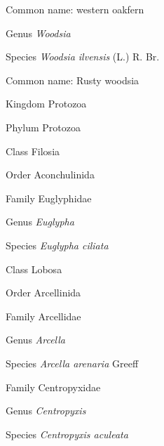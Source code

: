 \documentclass[9pt, article]{memoir}
\begin{document}
\begin{multicols}{2}
Common name: western oakfern

\vspace{6pt}\noindent\hspace{30pt}Genus \textit{Woodsia}


\vspace{6pt}\noindent\hspace{36pt}Species \textit{Woodsia ilvensis} (L.) R. Br.


Common name: Rusty woodsia

\vspace{6pt}\noindent\hspace{0pt}Kingdom Protozoa


\vspace{6pt}\noindent\hspace{6pt}Phylum Protozoa


\vspace{6pt}\noindent\hspace{12pt}Class Filosia


\vspace{6pt}\noindent\hspace{18pt}Order Aconchulinida


\vspace{6pt}\noindent\hspace{24pt}Family Euglyphidae


\vspace{6pt}\noindent\hspace{30pt}Genus \textit{Euglypha}


\vspace{6pt}\noindent\hspace{36pt}Species \textit{Euglypha ciliata}


\vspace{6pt}\noindent\hspace{12pt}Class Lobosa


\vspace{6pt}\noindent\hspace{18pt}Order Arcellinida


\vspace{6pt}\noindent\hspace{24pt}Family Arcellidae


\vspace{6pt}\noindent\hspace{30pt}Genus \textit{Arcella}


\vspace{6pt}\noindent\hspace{36pt}Species \textit{Arcella arenaria} Greeff


\vspace{6pt}\noindent\hspace{24pt}Family Centropyxidae


\vspace{6pt}\noindent\hspace{30pt}Genus \textit{Centropyxis}


\vspace{6pt}\noindent\hspace{36pt}Species \textit{Centropyxis aculeata}


\end{multicols}
\end{document}

